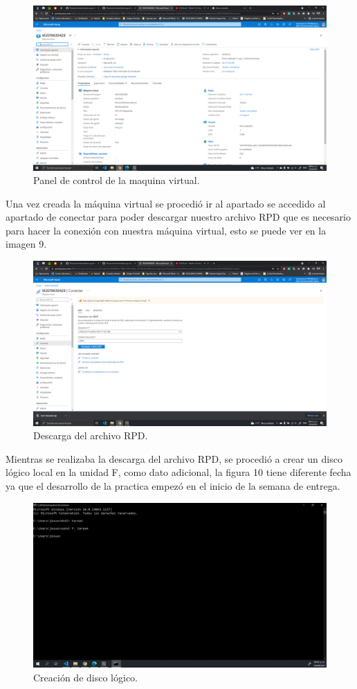 \documentclass[11pt]{article}
\begin{document}
		\begin{figure}[H]
			\centering
			\includegraphics[scale=0.34]{resources/Panelcontrol.png}
			\caption{Panel de control de la maquina virtual. }\label{fig:picture}
		\end{figure}
Una vez creada la máquina virtual se procedió ir al apartado se accedido al apartado de conectar para poder descargar nuestro archivo RPD que es necesario para hacer la conexión con nuestra máquina virtual, esto se puede ver en la imagen 9.
		\begin{figure}[H]
			\centering
			\includegraphics[scale=0.34]{resources/descargarpd.png}
			\caption{Descarga del archivo RPD. }\label{fig:picture}
		\end{figure}
Mientras se realizaba la descarga del archivo RPD, se procedió a crear un disco lógico local en la unidad F, como dato adicional, la figura 10 tiene diferente fecha ya que el desarrollo de la practica empezó en el inicio de la semana de entrega.
		\begin{figure}[H]
			\centering
			\includegraphics[scale=0.34]{resources/discologico.png}
			\caption{Creación de disco lógico. }\label{fig:picture}
		\end{figure}
\end{document}
